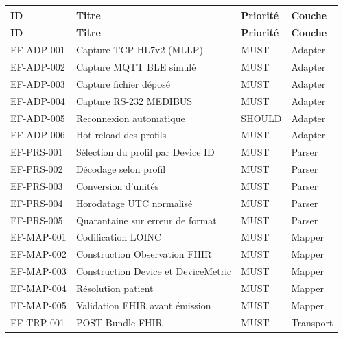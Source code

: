 \bridgezebra
\begin{longtable}{p{2.5cm}p{7.5cm}p{1.5cm}p{2.8cm}}
  \toprule
  \rowcolor{bridgeblue!90}
  {\color{white}\bfseries ID} & {\color{white}\bfseries Titre} & {\color{white}\bfseries Priorité} & {\color{white}\bfseries Couche} \\
  \midrule
  \endfirsthead
  \toprule
  \rowcolor{bridgeblue!90}
  {\color{white}\bfseries ID} & {\color{white}\bfseries Titre} & {\color{white}\bfseries Priorité} & {\color{white}\bfseries Couche} \\
  \midrule
  \endhead
  \bottomrule
  \endfoot
  EF-ADP-001 & Capture TCP HL7v2 (MLLP)                    & MUST   & Adapter \\
  EF-ADP-002 & Capture MQTT BLE simulé                     & MUST   & Adapter \\
  EF-ADP-003 & Capture fichier déposé                      & MUST   & Adapter \\
  EF-ADP-004 & Capture RS-232 MEDIBUS                      & MUST   & Adapter \\
  EF-ADP-005 & Reconnexion automatique                     & SHOULD & Adapter \\
  EF-ADP-006 & Hot-reload des profils                      & MUST   & Adapter \\
  EF-PRS-001 & Sélection du profil par Device ID           & MUST   & Parser \\
  EF-PRS-002 & Décodage selon profil                       & MUST   & Parser \\
  EF-PRS-003 & Conversion d'unités                         & MUST   & Parser \\
  EF-PRS-004 & Horodatage UTC normalisé                    & MUST   & Parser \\
  EF-PRS-005 & Quarantaine sur erreur de format            & MUST   & Parser \\
  EF-MAP-001 & Codification LOINC                          & MUST   & Mapper \\
  EF-MAP-002 & Construction Observation FHIR               & MUST   & Mapper \\
  EF-MAP-003 & Construction Device et DeviceMetric         & MUST   & Mapper \\
  EF-MAP-004 & Résolution patient                          & MUST   & Mapper \\
  EF-MAP-005 & Validation FHIR avant émission              & MUST   & Mapper \\
  EF-TRP-001 & POST Bundle FHIR                            & MUST   & Transport \\

\end{longtable}

